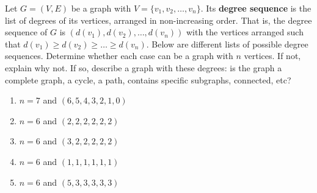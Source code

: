 \documentclass{article}
\theoremstyle{definition}
\begin{document}
\begin{question}
    Let $G=(V, E)$ be a graph with $V=\{v_1, v_2, \dots, v_n\}$. Its \textbf{degree sequence} is the list of degrees of its vertices, arranged in non-increasing order. That is, the degree sequence of $G$ is $(d(v_1), d(v_2), \dots, d(v_n))$ with the vertices arranged such that $d(v_1)\geq  d(v_2) \geq \dots \geq d(v_n)$. Below are different lists of possible degree sequences. Determine whether each case can be a graph with $n$ vertices. If not, explain why not. If so, describe a graph with these degrees: is the graph a complete graph, a cycle, a path, contains specific subgraphs, connected, etc?
\begin{enumerate}
	\item $n=7$ and $(6, 5, 4, 3, 2, 1, 0)$
	\item $n=6$ and $(2, 2, 2, 2, 2, 2)$
	\item $n=6$ and $(3, 2, 2, 2, 2, 2)$
	\item $n=6$ and $(1, 1, 1, 1, 1, 1)$
	\item $n=6$ and $(5, 3, 3, 3, 3, 3)$
	\end{enumerate}
\end{question}
\end{document}
